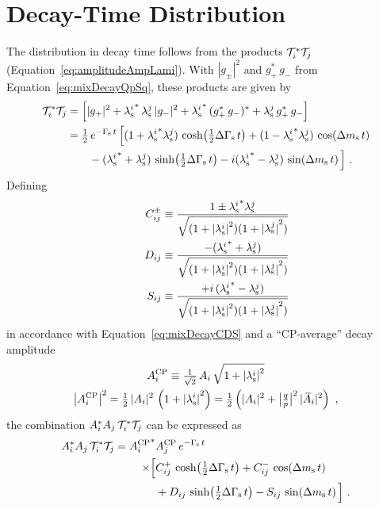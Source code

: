 \section{Decay-Time Distribution}
\label{sec:pheno_time}

The distribution in decay time follows from the products $\timeAmp^*\timeAmp[j]$ (Equation~\ref{eq:amplitudeAmpLami}). With $|g_\pm|^2$ and
$g_+^*\,g_-$ from Equation~\ref{eq:mixDecayQpSq}, these products are given by
\begin{align}
  \timeAmp^*\timeAmp[j]
  &=\left[ |g_+|^2 + \lamsi^*\,\lamsi[j]\, |g_-|^2 + \lamsi^*\, (g_+^*\,g_-)^* + \lamsi[j]\, g_+^*\,g_- \right] \nonumber \\
  &=\tfrac{1}{2}\, \eGst\, \Big[    (1+\lamsi^*\lamsi[j]) \, \cDGs
                                +   (1-\lamsi^*\lamsi[j]) \, \cDms \nonumber \\
  &\quad\quad            -   (\lamsi^* + \lamsi[j])\,   \sDGs
                                - i (\lamsi^* - \lamsi[j])\,   \sDms \Big] \ .
\end{align}
Defining
\begin{equation}
  \label{eq:CDSPolarDep}
  \begin{aligned}
    \Cf[ij]^\pm    &\equiv \frac{1\pm\lamsi^*\lamsi[j]}{\sqrt{(1+\lamsiSq)(1+\lamsiSq[j])}} \\
    \qquad \Df[ij] &\equiv \frac{-    (\lamsi^* + \lamsi[j])}{\sqrt{(1+\lamsiSq)(1+\lamsiSq[j])}} \\
    \qquad \Sf[ij] &\equiv \frac{+i\, (\lamsi^* - \lamsi[j])}{\sqrt{(1+\lamsiSq)(1+\lamsiSq[j])}}
  \end{aligned}
\end{equation}
in accordance with Equation~\ref{eq:mixDecayCDS} and a ``CP-average'' decay amplitude
\begin{equation}
  \label{eq:CPAvAmp}
  \begin{gathered}
    \magAv \equiv \tfrac{1}{\sqrt{2}}\, \Ai\, \sqrt{1+\lamsiSq} \\
    \left|\magAv\right|^2
      = \tfrac{1}{2}\, |\Ai|^2\, \left(1 + \lamsiSq\right)
      = \tfrac{1}{2} \left(|\Ai|^2 + \qpAbsAlt^2\,|\Abari|^2\right) \ ,
  \end{gathered}
\end{equation}
the combination $\Ai^*\Ai[j]\,\timeAmp^*\timeAmp[j]$ can be expressed as
\begin{equation}
  \label{eq:timeDep}
  \begin{aligned}
    \Ai^*\Ai[j]\,\timeAmp^*\timeAmp[j]
      = \magAvConj&\magAv[{\Ai[j]}]\, \eGst \\
        \times\Big[ &\Cf[ij]^+\,\cDGs + \Cf[ij]^-\,\cDms \\
                    &+ \Df[ij]\,\sDGs - \Sf[ij]\,\sDms \Big] \ .
  \end{aligned}
\end{equation}

